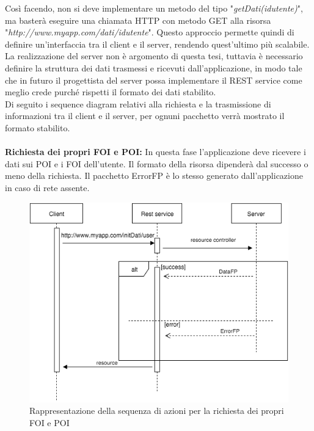 Così facendo, non si deve implementare un metodo del tipo "\textit{getDati(idutente)}", ma basterà eseguire una chiamata HTTP con metodo GET alla risorsa \\
"\textit{http://www.myapp.com/dati/idutente}". Questo approccio permette quindi di definire un'interfaccia tra il client e il server, rendendo quest'ultimo più scalabile. 
La realizzazione del server non è argomento di questa tesi, tuttavia è necessario definire la struttura dei dati trasmessi e ricevuti dall'applicazione, in modo tale che in futuro il progettista del server possa implementare il REST service come meglio crede purché rispetti il formato dei dati stabilito. \\
Di seguito i sequence diagram relativi alla richiesta e la trasmissione di informazioni tra il client e il server, per ognuni pacchetto verrà mostrato il formato stabilito.\\ \\
 \textbf{Richiesta dei propri FOI e POI:} In questa fase l'applicazione deve ricevere i dati sui POI e i FOI dell'utente. Il formato della risorsa dipenderà dal successo o meno della richiesta. Il pacchetto ErrorFP è lo stesso generato dall'applicazione in caso di rete assente. \\
 \begin{figure}[H]
	\centering
	\includegraphics[scale=0.7]{Implementazione/foipois.png}
	\caption{Rappresentazione della sequenza di azioni per la richiesta dei propri FOI e POI }
	\label{fig:rest}
\end{figure}

